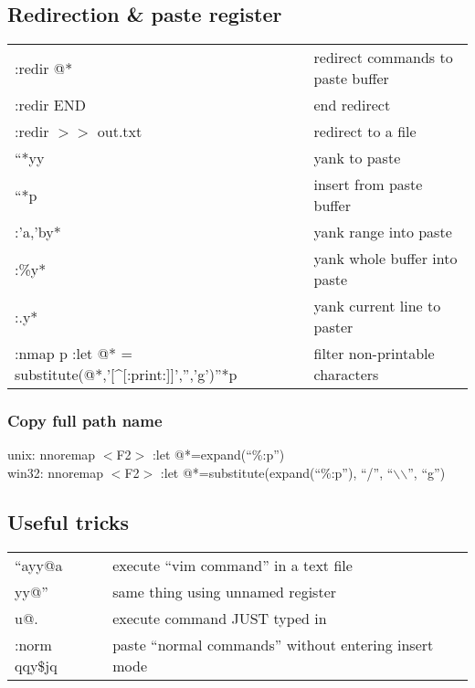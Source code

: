 \subsection{Redirection \& paste register}
\begin{center}
\begin{longtable}{l|l}
 :redir @* & redirect commands to paste buffer\\
 :redir END & end redirect\\
 :redir $>$$>$ out.txt & redirect to a file\\
 ``*yy & yank to paste\\
 ``*p & insert from paste buffer\\
 :'a,'by* & yank range into paste\\
 :\%y* & yank whole buffer into paste\\
 :.y* & yank current line to paster\\
 :nmap p :let @* = substitute(@*,'[\^{}[:print:]]','','g')''*p & filter non-printable characters\
\end{longtable}
\end{center}

\subsubsection{Copy full path name}
unix: nnoremap $<$F2$>$ :let @*=expand(``\%:p'')\\
win32: nnoremap $<$F2$>$ :let @*=substitute(expand(``\%:p''), ``/'', ``$\backslash$$\backslash$'', ``g'')

\subsection{Useful tricks}
\begin{center}
\begin{longtable}{l|l}
 ``ayy@a & execute ``vim command'' in a text file\\
 yy@'' & same thing using unnamed register\\
 u@. & execute command JUST typed in\\
 :norm qqy\$jq &  paste ``normal commands'' without entering insert mode
 \end{longtable}
\end{center}
